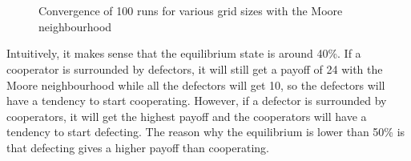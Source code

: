 \documentclass[a4paper]{article}
\begin{document}
\begin{figure}[H]
	\centering
	\\
	\\
	\caption{Convergence of 100 runs for various grid sizes with the Moore
	neighbourhood}
	\label{conv_sd}
\end{figure}

Intuitively, it makes sense that the equilibrium state is around 40\%. If a 
cooperator is surrounded by defectors, it will still get a payoff of 24 with the
Moore neighbourhood while all the defectors will get 10, so the defectors will
have a tendency to start cooperating. However, if a defector is surrounded by
cooperators, it will get the highest payoff and the cooperators will have a 
tendency to start defecting. The reason why the equilibrium is lower than 50\%
is that defecting gives a higher payoff than cooperating. \\
\end{document}
